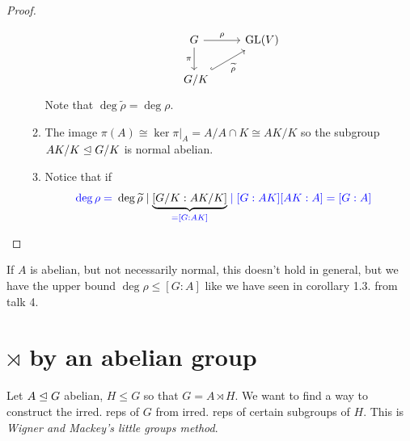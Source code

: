 \documentclass[a4paper]{article}
\begin{document}
\begin{cor}
\begin{proof}
\begin{enumerate}[{Case }(a):]
\begin{enumerate}[(1)]
                    \[\begin{tikzcd}
G \arrow[r, "\rho"] \arrow[d, "\pi"']               & \GL(V) \\
\
\fak{G}{K} \arrow[ru, "\tilde \rho"', hook] &
\end{tikzcd}\]
                    Note that $\deg \tilde \rho = \deg \rho$.
              \item The image $\pi(A) \cong \ker \pi|_{A} = A/A \cap K \cong AK/K$ so the subgroup $AK/K \trianglelefteq G/K $ is normal abelian.
              \item Notice that if
                    \begin{align}
                      \color{blue} \deg \rho =&\ \deg \widetilde \rho \mid \underbrace{[G/K:AK/K]}_{\color{blue}=[G:AK]} \color{blue}\mid [G:AK][AK:A] = [G:A]
                    \end{align}
            \end{enumerate}
    \end{enumerate}
  \end{proof}
\end{cor}

\begin{rem}
  If $A$ is abelian, but not necessarily normal, this doesn't hold in general, but we have the upper bound $\deg \rho \le [G: A]$ like we have seen in corollary 1.3. from talk 4.
\end{rem}

\section{$\rtimes$ by an abelian group}
Let $A \trianglelefteq G$ abelian, $H \le G$ so that $G = A \rtimes H$.
  We want to find a way to construct the irred. reps of $G$ from irred. reps of certain subgroups of $H$. This is \emph{Wigner and Mackey's little groups method}.
\end{document}
